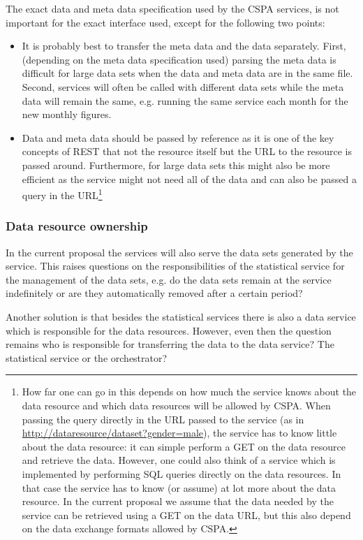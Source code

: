 \documentclass[a4paper]{article}
\begin{document}
The exact data and meta data specification used by the CSPA services, is not important
for the exact interface used, except for the following two points:
\begin{itemize}
  \item It is probably best to transfer the meta data and the data separately.
  First, (depending on the meta data specification used) parsing the meta data is
  difficult for large data sets when the data and meta data are in the same
  file. Second, services will often be called with different data sets while the
  meta data will remain the same, e.g. running the same service each month for
  the new monthly figures. 
  \item Data and meta data should be passed by reference as it is one of the key
  concepts of REST that not the resource itself but the URL to the resource is
  passed around. Furthermore, for large data sets this might also be more
  efficient as the service might not need all of the data and can also be passed
  a query in the URL\footnote{How far one can go in this depends on how much
  the service knows about the data resource and which data resources will be
  allowed by CSPA. When passing the query directly in the URL passed to the
  service (as in \url{http://dataresource/dataset?gender=male}), the service
  has to know little about the data resource: it can simple perform a GET on the
  data resource and retrieve the data. However, one could also think of a
  service which is implemented by performing SQL queries directly on the data
  resources. In that case the service has to know (or assume) at lot more about
  the data resource. In the current proposal we assume that the data needed by
  the service can be retrieved using a GET on the data URL, but this also depend
  on the data exchange formats allowed by CSPA.}
\end{itemize}

\subsubsection{Data resource ownership}
In the current proposal the services will also serve the data sets generated by
the service. This raises questions on the responsibilities of the statistical
service for the management of the data sets, e.g. do the data sets remain at the
service indefinitely or are they automatically removed after a certain period? 

Another solution is that besides the statistical services there is also a data
service which is responsible for the data resources. However, even then the
question remains who is responsible for transferring the data to the data
service? The statistical service or the orchestrator? 
\end{document}
